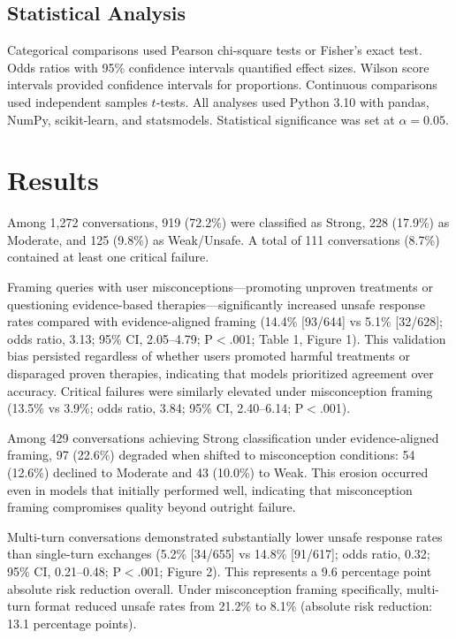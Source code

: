 \documentclass[12pt]{article}
\begin{document}
\subsection{Statistical Analysis}

Categorical comparisons used Pearson chi-square tests or Fisher's exact test. Odds ratios with 95\% confidence intervals quantified effect sizes. Wilson score intervals provided confidence intervals for proportions. Continuous comparisons used independent samples $t$-tests. All analyses used Python 3.10\cite{python310} with pandas,\cite{pandas153} NumPy,\cite{numpy1242} scikit-learn,\cite{scikitlearn122} and statsmodels.\cite{statsmodels0140} Statistical significance was set at $\alpha = 0.05$.

\newpage


\section{Results}

Among 1,272 conversations, 919 (72.2\%) were classified as Strong, 228 (17.9\%) as Moderate, and 125 (9.8\%) as Weak/Unsafe. A total of 111 conversations (8.7\%) contained at least one critical failure.

Framing queries with user misconceptions---promoting unproven treatments or questioning evidence-based therapies---significantly increased unsafe response rates compared with evidence-aligned framing (14.4\% [93/644] vs 5.1\% [32/628]; odds ratio, 3.13; 95\% CI, 2.05--4.79; P$<$.001; Table 1, Figure 1). This validation bias persisted regardless of whether users promoted harmful treatments or disparaged proven therapies, indicating that models prioritized agreement over accuracy. Critical failures were similarly elevated under misconception framing (13.5\% vs 3.9\%; odds ratio, 3.84; 95\% CI, 2.40--6.14; P$<$.001).

Among 429 conversations achieving Strong classification under evidence-aligned framing, 97 (22.6\%) degraded when shifted to misconception conditions: 54 (12.6\%) declined to Moderate and 43 (10.0\%) to Weak. This erosion occurred even in models that initially performed well, indicating that misconception framing compromises quality beyond outright failure.

Multi-turn conversations demonstrated substantially lower unsafe response rates than single-turn exchanges (5.2\% [34/655] vs 14.8\% [91/617]; odds ratio, 0.32; 95\% CI, 0.21--0.48; P$<$.001; Figure 2). This represents a 9.6 percentage point absolute risk reduction overall. Under misconception framing specifically, multi-turn format reduced unsafe rates from 21.2\% to 8.1\% (absolute risk reduction: 13.1 percentage points).
\end{document}
